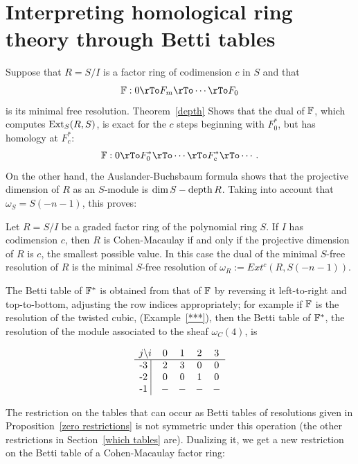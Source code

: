 \section{Interpreting homological ring theory through Betti tables}

Suppose that $R = S/I$ is a  factor ring of codimension $c$ in $S$ and that
$$
\FF: 0 \rTo F_{m} \rTo\cdots\rTo F_{0}
$$ 
is its minimal free resolution. Theorem~\ref{depth} %
Shows that the dual of $\FF$, which computes $\Ext_{S}(R,S)$, is exact for the $c$ steps beginning
with $F_{0}^{*}$, but has homology at $F_{c}^{*}$:
$$
\FF: 0 \rTo F_{0}^{*} \rTo\cdots\rTo F_{c}^{*} \rTo\cdots.
$$ 
On the other hand, the Auslander-Buchsbaum formula shows that the projective dimension of $R$
as an $S$-module is $\dim S - \depth R$. Taking into account that $\omega_{S} = S(-n-1)$, this proves:
\begin{proposition}
 Let $R = S/I$ be a graded factor ring of the polynomial ring $S$. If $I$ has codimension $c$, then
 $R$ is Cohen-Macaulay if and only if the projective dimension of $R$ is $c$, the smallest possible value.
 In this case the dual of the minimal $S$-free resolution of $R$ is the minimal $S$-free resolution of
 $\omega_{R} := Ext^{c}(R,S(-n-1))$.
\end{proposition}

The Betti table of $\FF^{*}$ is obtained from that of $\FF$ by reversing it left-to-right and top-to-bottom, adjusting the row indices appropriately; for example if $\FF$ is the resolution of the twisted cubic,
(Example~\ref{***}), then the Betti table of $\FF^{*}$, the resolution of the module associated to 
the sheaf $\omega_{C}(4)$, is 
\begin{small}
$$
\begin{matrix}
j \backslash i &0&1&2&3\\ \hline
\text{-3 }\vline &2&3&0&0\\
\text{-2 }\vline &0&0&1&0\\
\text{-1 }\vline &-&-&-&-\\
\end{matrix}
$$
\end{small}

The restriction on the tables that can occur as Betti tables of resolutions given in Proposition~\ref{zero restrictions} is not symmetric under this operation (the other restrictions in Section~\ref{which tables} are). Dualizing it, we get a new restriction on the Betti table of a Cohen-Macaulay factor ring:

